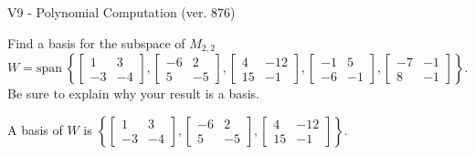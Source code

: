 \begin{exercise}
  \begin{exerciseTitle}V9 - Polynomial Computation (ver. 876)\end{exerciseTitle}
  \begin{exerciseStatement}
    Find a basis for the subspace of \(M_{2,2}\) 
\[W=\mathrm{span}\ \left\{\left[\begin{array}{cc}
1 & 3 \\
-3 & -4
\end{array}\right] , \left[\begin{array}{cc}
-6 & 2 \\
5 & -5
\end{array}\right] , \left[\begin{array}{cc}
4 & -12 \\
15 & -1
\end{array}\right] , \left[\begin{array}{cc}
-1 & 5 \\
-6 & -1
\end{array}\right] , \left[\begin{array}{cc}
-7 & -1 \\
8 & -1
\end{array}\right]\right\}.\]
 Be sure to explain why your result is a basis.


  \end{exerciseStatement}
  \begin{exerciseAnswer}
   A basis of \(W\) is  \(\left\{\left[\begin{array}{cc}
1 & 3 \\
-3 & -4
\end{array}\right] , \left[\begin{array}{cc}
-6 & 2 \\
5 & -5
\end{array}\right] , \left[\begin{array}{cc}
4 & -12 \\
15 & -1
\end{array}\right]\right\}\).
  


  \end{exerciseAnswer}
\end{exercise}